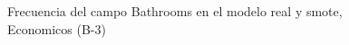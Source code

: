 \begin{figure}[H]
    \centering
    
    \caption{Frecuencia del campo Bathrooms en el modelo real y smote, Economicos (B-3)}
    \label{frecuency-Bathrooms-smote-enc}
\end{figure}